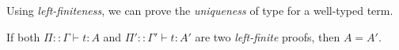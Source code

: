 %
%

Using \emph{left-finiteness}, we can prove the \emph{uniqueness} of type for a well-typed term. 


\begin{proposition}
\label{proposition-left-finite-unique}
If both $\Pi::\Gamma \vdash t:A$ and $\Pi'::\Gamma' \vdash t:A'$ are two \emph{left-finite} proofs,
then $A = A'$.
\end{proposition}

%
%
%
%
%
%
%
